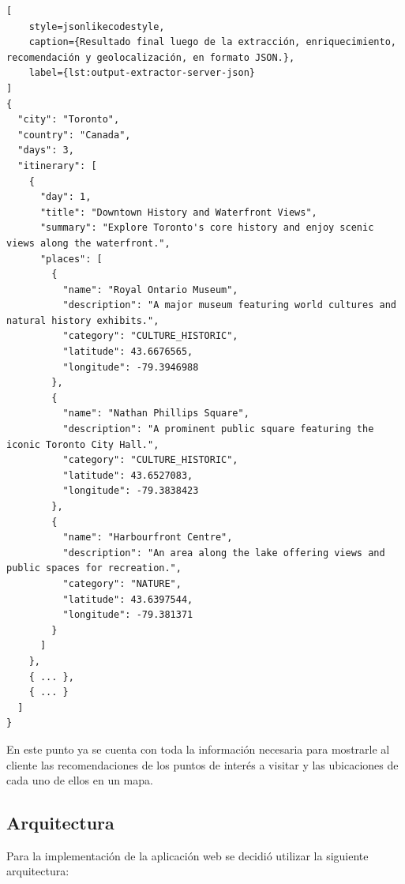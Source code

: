 \begin{lstlisting}[
    style=jsonlikecodestyle,
    caption={Resultado final luego de la extracción, enriquecimiento, recomendación y geolocalización, en formato JSON.},
    label={lst:output-extractor-server-json}
]
{
  "city": "Toronto",
  "country": "Canada",
  "days": 3,
  "itinerary": [
    {
      "day": 1,
      "title": "Downtown History and Waterfront Views",
      "summary": "Explore Toronto's core history and enjoy scenic views along the waterfront.",
      "places": [
        {
          "name": "Royal Ontario Museum",
          "description": "A major museum featuring world cultures and natural history exhibits.",
          "category": "CULTURE_HISTORIC",
          "latitude": 43.6676565,
          "longitude": -79.3946988
        },
        {
          "name": "Nathan Phillips Square",
          "description": "A prominent public square featuring the iconic Toronto City Hall.",
          "category": "CULTURE_HISTORIC",
          "latitude": 43.6527083,
          "longitude": -79.3838423
        },
        {
          "name": "Harbourfront Centre",
          "description": "An area along the lake offering views and public spaces for recreation.",
          "category": "NATURE",
          "latitude": 43.6397544,
          "longitude": -79.381371
        }
      ]
    },
    { ... },
    { ... }
  ]
}
\end{lstlisting}

En este punto ya se cuenta con toda la información necesaria para mostrarle al cliente las recomendaciones de los puntos
de interés a visitar y las ubicaciones de cada uno de ellos en un mapa.

\subsection{Arquitectura}%
\label{subsec:architecture}

Para la implementación de la aplicación web se decidió utilizar la siguiente arquitectura:


